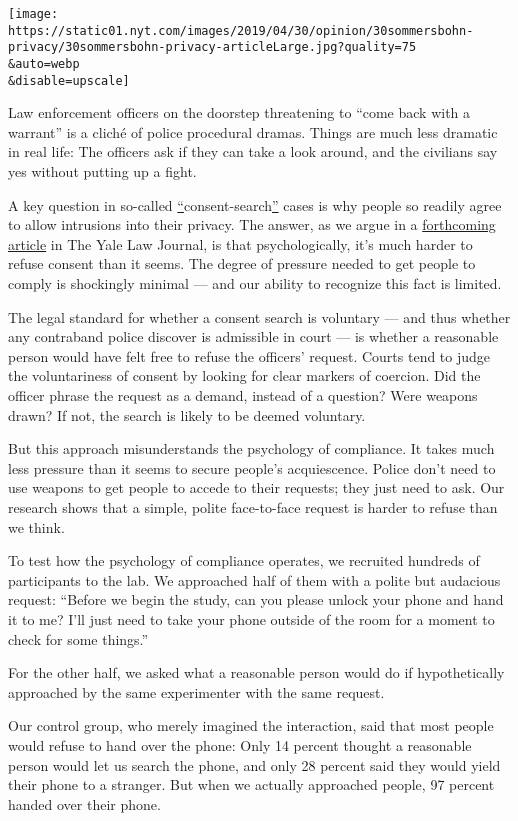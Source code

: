 \texttt{[image: https://static01.nyt.com/images/2019/04/30/opinion/30sommersbohn-privacy/30sommersbohn-privacy-articleLarge.jpg?quality=75\\\&auto=webp\\\&disable=upscale]}

Law enforcement officers on the doorstep threatening to ``come back with
a warrant'' is a cliché of police procedural dramas. Things are much
less dramatic in real life: The officers ask if they can take a look
around, and the civilians say yes without putting up a fight.

A key question in so-called
\href{http://ssrn.com/abstract=3369844}{``}consent\href{http://ssrn.com/abstract=3369844}{}-search\href{http://ssrn.com/abstract=3369844}{''}
cases is why people so readily agree to allow intrusions into their
privacy. The answer, as we argue in a
\href{http://ssrn.com/abstract=3369844}{forthcoming article} in The Yale
Law Journal, is that psychologically, it's much harder to refuse consent
than it seems. The degree of pressure needed to get people to comply is
shockingly minimal --- and our ability to recognize this fact is
limited.

The legal standard for whether a consent search is voluntary --- and
thus whether any contraband police discover is admissible in court ---
is whether a reasonable person would have felt free to refuse the
officers' request. Courts tend to judge the voluntariness of consent by
looking for clear markers of coercion. Did the officer phrase the
request as a demand, instead of a question? Were weapons drawn? If not,
the search is likely to be deemed voluntary.

But this approach misunderstands the psychology of compliance. It takes
much less pressure than it seems to secure people's acquiescence. Police
don't need to use weapons to get people to accede to their requests;
they just need to ask. Our research shows that a simple, polite
face-to-face request is harder to refuse than we think.

To test how the psychology of compliance operates, we recruited hundreds
of participants to the lab. We approached half of them with a polite but
audacious request: ``Before we begin the study, can you please unlock
your phone and hand it to me? I'll just need to take your phone outside
of the room for a moment to check for some things.''

For the other half, we asked what a reasonable person would do if
hypothetically approached by the same experimenter with the same
request.

Our control group, who merely imagined the interaction, said that most
people would refuse to hand over the phone: Only 14 percent thought a
reasonable person would let us search the phone, and only 28 percent
said they would yield their phone to a stranger. But when we actually
approached people, 97 percent handed over their phone.

